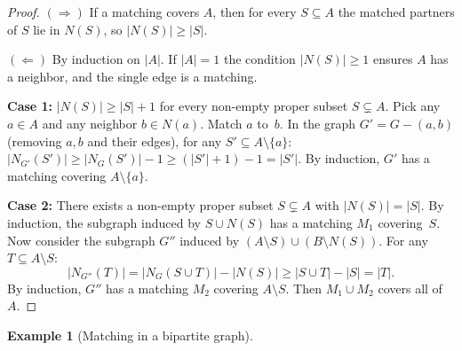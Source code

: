 \documentclass[12pt,a4paper,openany]{book}
\theoremstyle{definition}
\newtheorem{example}[definition]{Example}
\theoremstyle{plain}
\theoremstyle{remark}
\newcommand{\abs}[1]{\left|#1\right|}
\begin{document}
\begin{proof}
$(\Rightarrow)$\; If a matching covers $A$, then for every
$S\subseteq A$ the matched partners of $S$ lie in $N(S)$, so
$\abs{N(S)}\ge\abs{S}$.

$(\Leftarrow)$\; By induction on $\abs{A}$.  If $\abs{A}=1$ the
condition $\abs{N(S)}\ge 1$ ensures $A$ has a neighbor, and the single
edge is a matching.

\textbf{Case 1:} $\abs{N(S)}\ge\abs{S}+1$ for every non-empty proper
subset $S\subsetneq A$.  Pick any $a\in A$ and any neighbor $b\in N(a)$.
Match $a$ to~$b$.  In the graph $G'=G-(a,b)$ (removing $a,b$ and their
edges), for any $S'\subseteq A\setminus\{a\}$:
$\abs{N_{G'}(S')}\ge\abs{N_G(S')}-1\ge(\abs{S'}+1)-1=\abs{S'}$.
By induction, $G'$ has a matching covering $A\setminus\{a\}$.

\textbf{Case 2:} There exists a non-empty proper subset $S\subsetneq A$
with $\abs{N(S)}=\abs{S}$.  By induction, the subgraph induced by
$S\cup N(S)$ has a matching $M_1$ covering~$S$.  Now consider the
subgraph $G''$ induced by $(A\setminus S)\cup(B\setminus N(S))$.  For
any $T\subseteq A\setminus S$:
\[
  \abs{N_{G''}(T)}=\abs{N_G(S\cup T)}-\abs{N(S)}
  \ge\abs{S\cup T}-\abs{S}=\abs{T}.
\]
By induction, $G''$ has a matching $M_2$ covering $A\setminus S$.  Then
$M_1\cup M_2$ covers all of~$A$.
\end{proof}

\begin{example}[Matching in a bipartite graph]
\label{ex:matching}

\begin{center}
\end{center}
\end{example}

\end{document}
